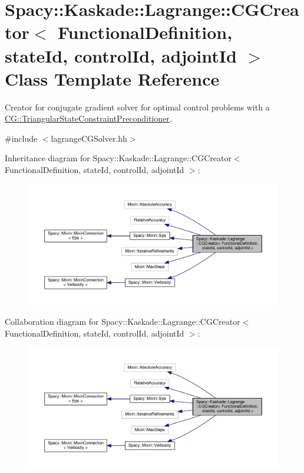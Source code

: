 \hypertarget{classSpacy_1_1Kaskade_1_1Lagrange_1_1CGCreator}{\section{Spacy\-:\-:Kaskade\-:\-:Lagrange\-:\-:C\-G\-Creator$<$ Functional\-Definition, state\-Id, control\-Id, adjoint\-Id $>$ Class Template Reference}
\label{classSpacy_1_1Kaskade_1_1Lagrange_1_1CGCreator}
}


Creator for conjugate gradient solver for optimal control problems with a \hyperlink{classSpacy_1_1CG_1_1TriangularStateConstraintPreconditioner}{C\-G\-::\-Triangular\-State\-Constraint\-Preconditioner}.  




{\ttfamily \#include $<$lagrange\-C\-G\-Solver.\-hh$>$}



Inheritance diagram for Spacy\-:\-:Kaskade\-:\-:Lagrange\-:\-:C\-G\-Creator$<$ Functional\-Definition, state\-Id, control\-Id, adjoint\-Id $>$\-:
\nopagebreak
\begin{figure}[H]
\begin{center}
\leavevmode
\includegraphics[width=350pt]{classSpacy_1_1Kaskade_1_1Lagrange_1_1CGCreator__inherit__graph}
\end{center}
\end{figure}


Collaboration diagram for Spacy\-:\-:Kaskade\-:\-:Lagrange\-:\-:C\-G\-Creator$<$ Functional\-Definition, state\-Id, control\-Id, adjoint\-Id $>$\-:
\nopagebreak
\begin{figure}[H]
\begin{center}
\leavevmode
\includegraphics[width=350pt]{classSpacy_1_1Kaskade_1_1Lagrange_1_1CGCreator__coll__graph}
\end{center}
\end{figure}
